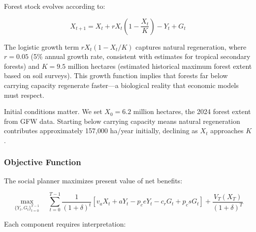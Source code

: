 Forest stock evolves according to:

\begin{equation}
X_{t+1} = X_t + rX_t \left( 1 - \frac{X_t}{K} \right) - Y_t + G_t
\end{equation}

The logistic growth term $rX_t(1 - X_t/K)$ captures natural regeneration, where $r = 0.05$ (5\% annual growth rate, consistent with \citet{chazdon2016carbon} estimates for tropical secondary forests) and $K = 9.5$ million hectares (estimated historical maximum forest extent based on soil surveys). This growth function implies that forests far below carrying capacity regenerate faster—a biological reality that economic models must respect.

Initial conditions matter. We set $X_0 = 6.2$ million hectares, the 2024 forest extent from GFW data. Starting below carrying capacity means natural regeneration contributes approximately 157,000 ha/year initially, declining as $X_t$ approaches $K$.

\subsubsection{Objective Function}

The social planner maximizes present value of net benefits:

\begin{equation}
\max_{\{Y_t, G_t\}_{t=0}^{T-1}} \quad \sum_{t=0}^{T-1} \frac{1}{(1+\delta)^t} \left[ v_a X_t + aY_t - p_c eY_t - c_r G_t + p_c sG_t \right] + \frac{V_T(X_T)}{(1+\delta)^T}
\end{equation}

Each component requires interpretation:

